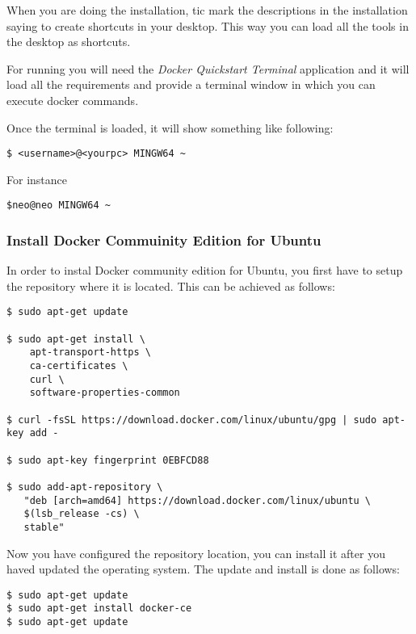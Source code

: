 When you are doing the installation, tic mark the descriptions in the
installation saying to create shortcuts in your desktop. This way you
can load all the tools in the desktop as shortcuts.

For running you will need the \textit{Docker Quickstart Terminal} application
and it will load all the requirements and provide a terminal window in
which you can execute docker commands.

Once the terminal is loaded, it will show something like following:

\begin{verbatim}
$ <username>@<yourpc> MINGW64 ~
\end{verbatim}

For instance

\begin{verbatim}
$neo@neo MINGW64 ~
\end{verbatim}

\subsubsection{Install Docker Commuinity Edition for
Ubuntu}\label{install-docker-commuinity-edition-for-ubuntu}

In order to instal Docker community edition for Ubuntu, you first have
to setup the repository where it is located. This can be achieved as
follows:

\begin{verbatim}
$ sudo apt-get update

$ sudo apt-get install \
    apt-transport-https \
    ca-certificates \
    curl \
    software-properties-common

$ curl -fsSL https://download.docker.com/linux/ubuntu/gpg | sudo apt-key add -

$ sudo apt-key fingerprint 0EBFCD88

$ sudo add-apt-repository \
   "deb [arch=amd64] https://download.docker.com/linux/ubuntu \
   $(lsb_release -cs) \
   stable"
\end{verbatim}

Now you have configured the repository location, you can install it
after you haved updated the operating system. The update and install is
done as follows:

\begin{verbatim}
$ sudo apt-get update
$ sudo apt-get install docker-ce
$ sudo apt-get update
\end{verbatim}

